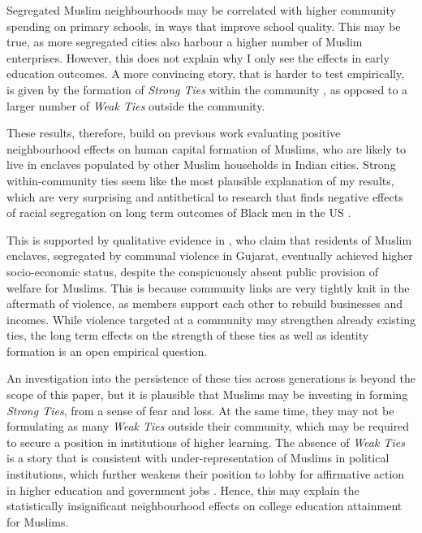 \documentclass{article}
\begin{document}
Segregated Muslim neighbourhoods may be correlated with higher community spending on primary schools, in ways that improve school quality. This may be true, as more segregated cities also harbour a higher number of Muslim enterprises. However, this does not explain why I only see the effects in early education outcomes. A more convincing story, that is harder to test empirically, is given by the formation of \textit{Strong Ties} within the community \citep{granovetter1973strength}, as opposed to a larger number of \textit{Weak Ties} outside the community. 

 These results, therefore, build on previous work evaluating positive neighbourhood effects on human capital formation of Muslims, who are likely to live in enclaves populated by other Muslim households \citep{geruso2018neighborhood} in Indian cities. Strong within-community ties seem like the most plausible explanation of my results, which are very surprising and antithetical to research that finds negative effects of racial segregation on long term outcomes of Black men in the US \citep{chetty2018impacts}.  

This is supported by qualitative evidence in \cite{jaffrelot2012muslims}, who claim that residents of Muslim enclaves, segregated by communal violence in Gujarat, eventually achieved higher socio-economic status, despite the conspicuously absent public provision of welfare for Muslims. This is because community links are very tightly knit in the aftermath of violence, as members support each other to rebuild businesses and incomes. While violence targeted at a community may strengthen already existing ties, the long term effects on the strength of these ties as well as identity formation is an open empirical question. 

An investigation into the persistence of these ties across generations is beyond the scope of this paper, but it is plausible that Muslims may be investing in forming \textit{Strong Ties}, from a sense of fear and loss. At the same time, they may not be formulating as many \textit{Weak Ties} outside their community, which may be required to secure a position in institutions of higher learning. The absence of \textit{Weak Ties} is a story that is consistent with under-representation of Muslims in political institutions, which further weakens their position to lobby for affirmative action in higher education and government jobs \citep{alam2010social}. Hence, this may explain the  statistically insignificant neighbourhood effects on college education attainment for Muslims.
\end{document}
